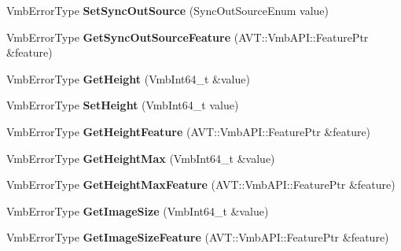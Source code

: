 \begin{DoxyCompactItemize}
\item 
\hypertarget{classMakoCamera_a1c2409a5b30e1cffcc0b829de0e7b1f5}{Vmb\-Error\-Type {\bfseries Set\-Sync\-Out\-Source} (Sync\-Out\-Source\-Enum value)}\label{classMakoCamera_a1c2409a5b30e1cffcc0b829de0e7b1f5}

\item 
\hypertarget{classMakoCamera_a08ea24e5e3bea0adca66154215d647b2}{Vmb\-Error\-Type {\bfseries Get\-Sync\-Out\-Source\-Feature} (A\-V\-T\-::\-Vmb\-A\-P\-I\-::\-Feature\-Ptr \&feature)}\label{classMakoCamera_a08ea24e5e3bea0adca66154215d647b2}

\item 
\hypertarget{classMakoCamera_a503fabe0138feb8a8c55be3edd7a539e}{Vmb\-Error\-Type {\bfseries Get\-Height} (Vmb\-Int64\-\_\-t \&value)}\label{classMakoCamera_a503fabe0138feb8a8c55be3edd7a539e}

\item 
\hypertarget{classMakoCamera_a886651c782e062e007c0530c7905f2e1}{Vmb\-Error\-Type {\bfseries Set\-Height} (Vmb\-Int64\-\_\-t value)}\label{classMakoCamera_a886651c782e062e007c0530c7905f2e1}

\item 
\hypertarget{classMakoCamera_adf69b04f34c53c2810f7ca8fa15d53b5}{Vmb\-Error\-Type {\bfseries Get\-Height\-Feature} (A\-V\-T\-::\-Vmb\-A\-P\-I\-::\-Feature\-Ptr \&feature)}\label{classMakoCamera_adf69b04f34c53c2810f7ca8fa15d53b5}

\item 
\hypertarget{classMakoCamera_a6ba5f92c8f6cec5ac3ddf3fea28fbf90}{Vmb\-Error\-Type {\bfseries Get\-Height\-Max} (Vmb\-Int64\-\_\-t \&value)}\label{classMakoCamera_a6ba5f92c8f6cec5ac3ddf3fea28fbf90}

\item 
\hypertarget{classMakoCamera_a1a097c5663bcea310108ab6e48e96413}{Vmb\-Error\-Type {\bfseries Get\-Height\-Max\-Feature} (A\-V\-T\-::\-Vmb\-A\-P\-I\-::\-Feature\-Ptr \&feature)}\label{classMakoCamera_a1a097c5663bcea310108ab6e48e96413}

\item 
\hypertarget{classMakoCamera_aedbf19b94d6b6bc2535a1967f29355d6}{Vmb\-Error\-Type {\bfseries Get\-Image\-Size} (Vmb\-Int64\-\_\-t \&value)}\label{classMakoCamera_aedbf19b94d6b6bc2535a1967f29355d6}

\item 
\hypertarget{classMakoCamera_a677f31b91a72fd49e3760e74492dd16d}{Vmb\-Error\-Type {\bfseries Get\-Image\-Size\-Feature} (A\-V\-T\-::\-Vmb\-A\-P\-I\-::\-Feature\-Ptr \&feature)}\label{classMakoCamera_a677f31b91a72fd49e3760e74492dd16d}


\end{DoxyCompactItemize}
